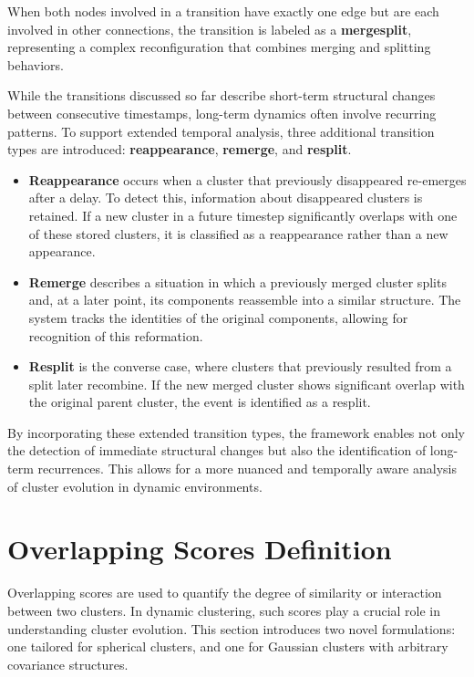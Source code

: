 When both nodes involved in a transition have exactly one edge but are each
involved in other connections, the transition is labeled as a
\textbf{mergesplit}, representing a complex reconfiguration that combines
merging and splitting behaviors.



While the transitions discussed so far describe short-term structural changes
between consecutive timestamps, long-term dynamics often involve recurring
patterns. To support extended temporal analysis, three additional transition
types are introduced: \textbf{reappearance}, \textbf{remerge}, and
\textbf{resplit}.

\begin{itemize}
      \item \textbf{Reappearance} occurs when a cluster that previously disappeared re-emerges after a delay. To detect this, information about disappeared clusters is retained. If a new cluster in a future timestep significantly overlaps with one of these stored clusters, it is classified as a reappearance rather than a new appearance.

      \item \textbf{Remerge} describes a situation in which a previously merged cluster splits and, at a later point, its components reassemble into a similar structure. The system tracks the identities of the original components, allowing for recognition of this reformation.

      \item \textbf{Resplit} is the converse case, where clusters that previously resulted from a split later recombine. If the new merged cluster shows significant overlap with the original parent cluster, the event is identified as a resplit.
\end{itemize}

By incorporating these extended transition types, the framework enables not
only the detection of immediate structural changes but also the identification
of long-term recurrences. This allows for a more nuanced and temporally aware
analysis of cluster evolution in dynamic environments.

\section{Overlapping Scores Definition}\label{sec:overlapping_scores}
Overlapping scores are used to quantify the degree of similarity or interaction
between two clusters. In dynamic clustering, such scores play a crucial role in
understanding cluster evolution. This section introduces two novel
formulations: one tailored for spherical clusters, and one for Gaussian
clusters with arbitrary covariance structures.

